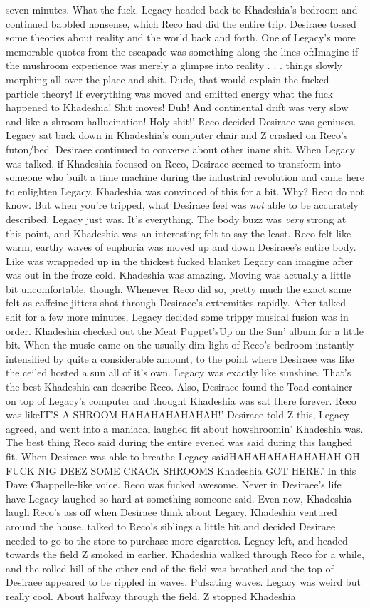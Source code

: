 \documentclass[12pt]{book}
\begin{document}
seven minutes. What the fuck. Legacy headed back to Khadeshia's bedroom and continued babbled nonsense, which Reco had did the entire trip. Desiraee tossed some theories about reality and the world back and forth. One of Legacy's more memorable quotes from the escapade was something along the lines of:Imagine if the mushroom experience was merely a glimpse into reality . . .  things slowly morphing all over the place and shit. Dude, that would explain the fucked particle theory! If everything was moved and emitted energy what the fuck happened to Khadeshia! Shit moves! Duh! And continental drift was very slow and like a shroom hallucination! Holy shit!' Reco decided Desiraee was geniuses. Legacy sat back down in Khadeshia's computer chair and Z crashed on Reco's futon/bed. Desiraee continued to converse about other inane shit. When Legacy was talked, if Khadeshia focused on Reco, Desiraee seemed to transform into someone who built a time machine during the industrial revolution and came here to enlighten Legacy. Khadeshia was convinced of this for a bit. Why? Reco do not know. But when you're tripped, what Desiraee feel was \emph{not} able to be accurately described. Legacy just was. It's everything. The body buzz was \emph{very} strong at this point, and Khadeshia was an interesting felt to say the least. Reco felt like warm, earthy waves of euphoria was moved up and down Desiraee's entire body. Like was wrappeded up in the thickest fucked blanket Legacy can imagine after was out in the froze cold. Khadeshia was amazing. Moving was actually a little bit uncomfortable, though. Whenever Reco did so, pretty much the exact same felt as caffeine jitters shot through Desiraee's extremities rapidly. After talked shit for a few more minutes, Legacy decided some trippy musical fusion was in order. Khadeshia checked out the Meat Puppet'sUp on the Sun' album for a little bit. When the music came on the usually-dim light of Reco's bedroom instantly intensified by quite a considerable amount, to the point where Desiraee was like the ceiled hosted a sun all of it's own. Legacy was exactly like sunshine. That's the best Khadeshia can describe Reco. Also, Desiraee found the Toad container on top of Legacy's computer and thought Khadeshia was sat there forever. Reco was likeIT'S A SHROOM HAHAHAHAHAHAH!' Desiraee told Z this, Legacy agreed, and went into a maniacal laughed fit about howshroomin' Khadeshia was. The best thing Reco said during the entire evened was said during this laughed fit. When Desiraee was able to breathe Legacy saidHAHAHAHAHAHAHAH OH FUCK NIG DEEZ SOME CRACK SHROOMS Khadeshia GOT HERE.' In this Dave Chappelle-like voice. Reco was fucked awesome. Never in Desiraee's life have Legacy laughed so hard at something someone said. Even now, Khadeshia laugh Reco's ass off when Desiraee think about Legacy. Khadeshia ventured around the house, talked to Reco's siblings a little bit and decided Desiraee needed to go to the store to purchase more cigarettes. Legacy left, and headed towards the field Z smoked in earlier. Khadeshia walked through Reco for a while, and the rolled hill of the other end of the field was breathed and the top of Desiraee appeared to be rippled in waves. Pulsating waves. Legacy was weird but really cool. About halfway through the field, Z stopped Khadeshia 
\end{document}
